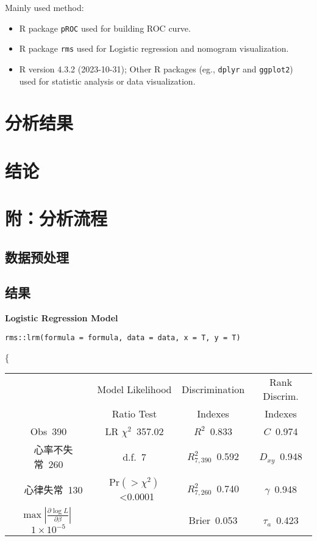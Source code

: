 \documentclass[
]{article}
\providecommand{\tightlist}{%
  \setlength{\itemsep}{0pt}\setlength{\parskip}{0pt}}
\begin{document}
Mainly used method:

\begin{itemize}
\tightlist
\item
  R package \texttt{pROC} used for building ROC curve.
\item
  R package \texttt{rms} used for Logistic regression and nomogram visualization.
\item
  R version 4.3.2 (2023-10-31); Other R packages (eg., \texttt{dplyr} and \texttt{ggplot2}) used for statistic analysis or data visualization.
\end{itemize}

\hypertarget{results}{%
\section{分析结果}\label{results}}

\hypertarget{dis}{%
\section{结论}\label{dis}}

\hypertarget{workflow}{%
\section{附：分析流程}\label{workflow}}

\hypertarget{ux6570ux636eux9884ux5904ux7406}{%
\subsection{数据预处理}\label{ux6570ux636eux9884ux5904ux7406}}

\hypertarget{ux7ed3ux679c}{%
\subsection{结果}\label{ux7ed3ux679c}}

\noindent \textbf{Logistic Regression Model}

\begin{verbatim}
rms::lrm(formula = formula, data = data, x = T, y = T)
\end{verbatim}

\{\selectfont 

\begin{center}\begin{tabular}{|c|c|c|c|}\hline
&Model Likelihood&Discrimination&Rank Discrim.\\
&Ratio Test&Indexes&Indexes\\\hline
Obs~\hfill 390&LR $\chi^{2}$~\hfill 357.02&$R^{2}$~\hfill 0.833&$C$~\hfill 0.974\\
~~心率不失常~\hfill 260&d.f.~\hfill 7&$R^{2}_{7,390}$~\hfill 0.592&$D_{xy}$~\hfill 0.948\\
~~心律失常~\hfill 130&Pr$(>\chi^{2})$~\hfill \textless 0.0001&$R^{2}_{7,260}$~\hfill 0.740&$\gamma$~\hfill 0.948\\
$\max|\frac{\partial\log L}{\partial \beta}|$~\hfill $1\!\times\!10^{-5}$&&Brier~\hfill 0.053&$\tau_{a}$~\hfill 0.423\\
\hline
\end{tabular}
\end{center}
\end{document}
